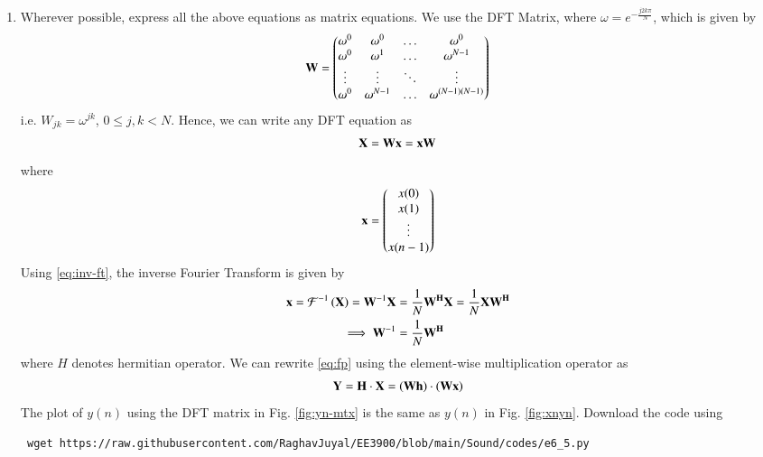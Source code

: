 \documentclass[journal,12pt,twocolumn]{IEEEtran}
\renewcommand\thesection{\arabic{section}}
\begin{document}
\begin{enumerate}[label=\thesection.\arabic*]
\begin{figure}[!ht]
		\label{fig:y-n-dft_fft}
	\end{figure}
	\item Wherever possible, express all the above equations as matrix equations.
	\solution
	We use the DFT Matrix, where $\omega = e^{-\frac{j2k\pi}{N}}$, which is given by
	\begin{align}
		\mathbf{W} = 
		\begin{pmatrix}
			\omega^0 & \omega^0 & \ldots & \omega^0 \\
			\omega^0 & \omega^1 & \ldots & \omega^{N - 1} \\
			\vdots & \vdots & \ddots & \vdots \\
			\omega^0 & \omega^{N - 1} & \ldots & \omega^{(N -1)(N - 1)}
		\end{pmatrix}
	\end{align}
	i.e. $W_{jk} = \omega^{jk}$, $0 \leq j, k < N$. Hence, we can write any DFT equation as
	\begin{align}
		\mathbf{X} = \mathbf{W}\mathbf{x} = \mathbf{x}\mathbf{W}
	\end{align}
	\noindent where
	\begin{align}
		\mathbf{x} = 
		\begin{pmatrix}
			x(0) \\ x(1) \\ \vdots \\ x(n - 1)
		\end{pmatrix}
	\end{align}
	\noindent Using \eqref{eq:inv-ft}, the inverse Fourier Transform is given by
	\begin{align}
		\mathbf{x} = \mathcal{F}^{-1}\left(\mathbf{X}\right) = \mathbf{W}^{-1}\mathbf{X} &= 
		\frac{1}{N}\mathbf{W^{H}}\mathbf{X} = \frac{1}{N}\mathbf{X}\mathbf{W^{H}} \\ 
		\implies \mathbf{W}^{-1} &= \frac{1}{N}\mathbf{W^{H}}
	\end{align}
	\noindent where $H$ denotes hermitian operator. We can rewrite \eqref{eq:fp} using the
	element-wise multiplication operator as
	\begin{align}
		\mathbf{Y} = \mathbf{H}\cdot\mathbf{X} = \left(\mathbf{W}\mathbf{h}\right)\cdot\left(\mathbf{W}\mathbf{x}\right)
	\end{align}
	The plot of $y(n)$ using the DFT matrix in Fig. \eqref{fig:yn-mtx} is the same as $y(n)$ in 
	Fig. \eqref{fig:xnyn}. Download the code using
	\begin{lstlisting}
 wget https://raw.githubusercontent.com/RaghavJuyal/EE3900/blob/main/Sound/codes/e6_5.py
	\end{lstlisting}
\end{enumerate}
\end{document}
